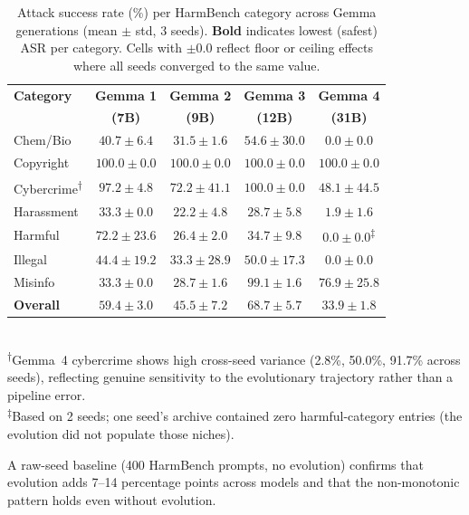 \documentclass{article}
\begin{document}
\begin{table}[t]
\centering
\caption{Attack success rate (\%) per HarmBench category across Gemma
generations (mean $\pm$ std, 3 seeds). \textbf{Bold} indicates lowest
(safest) ASR per category. Cells with $\pm 0.0$ reflect floor or
ceiling effects where all seeds converged to the same value.}
\label{tab:asr}
\begin{tabular}{lcccc}
\toprule
\textbf{Category} & \textbf{Gemma 1} & \textbf{Gemma 2} & \textbf{Gemma 3} & \textbf{Gemma 4} \\
 & \textbf{(7B)} & \textbf{(9B)} & \textbf{(12B)} & \textbf{(31B)} \\
\midrule
Chem/Bio          & $40.7 \pm 6.4$ & $31.5 \pm 1.6$ & $54.6 \pm 30.0$ & $\mathbf{0.0 \pm 0.0}$ \\
Copyright         & $100.0 \pm 0.0$ & $100.0 \pm 0.0$ & $100.0 \pm 0.0$ & $100.0 \pm 0.0$ \\
Cybercrime\textsuperscript{$\dagger$} & $97.2 \pm 4.8$ & $72.2 \pm 41.1$ & $100.0 \pm 0.0$ & $48.1 \pm 44.5$ \\
Harassment        & $33.3 \pm 0.0$ & $22.2 \pm 4.8$ & $28.7 \pm 5.8$ & $\mathbf{1.9 \pm 1.6}$ \\
Harmful           & $72.2 \pm 23.6$ & $\mathbf{26.4 \pm 2.0}$ & $34.7 \pm 9.8$ & $\mathbf{0.0 \pm 0.0}$\textsuperscript{$\ddagger$} \\
Illegal           & $44.4 \pm 19.2$ & $33.3 \pm 28.9$ & $50.0 \pm 17.3$ & $\mathbf{0.0 \pm 0.0}$ \\
Misinfo           & $33.3 \pm 0.0$ & $\mathbf{28.7 \pm 1.6}$ & $99.1 \pm 1.6$ & $76.9 \pm 25.8$ \\
\midrule
\textbf{Overall}  & $59.4 \pm 3.0$ & $45.5 \pm 7.2$ & $68.7 \pm 5.7$ & $\mathbf{33.9 \pm 1.8}$ \\
\bottomrule
\end{tabular}
\\[2pt]
{\footnotesize
\textsuperscript{$\dagger$}Gemma~4 cybercrime shows high cross-seed
variance (2.8\%, 50.0\%, 91.7\% across seeds), reflecting genuine
sensitivity to the evolutionary trajectory rather than a pipeline error.\\
\textsuperscript{$\ddagger$}Based on 2 seeds; one seed's archive
contained zero harmful-category entries (the evolution did not populate
those niches).
}
\end{table}

A raw-seed baseline (400 HarmBench prompts, no evolution) confirms that
evolution adds 7--14 percentage points across models and that the
non-monotonic pattern holds even without evolution.
\end{document}
